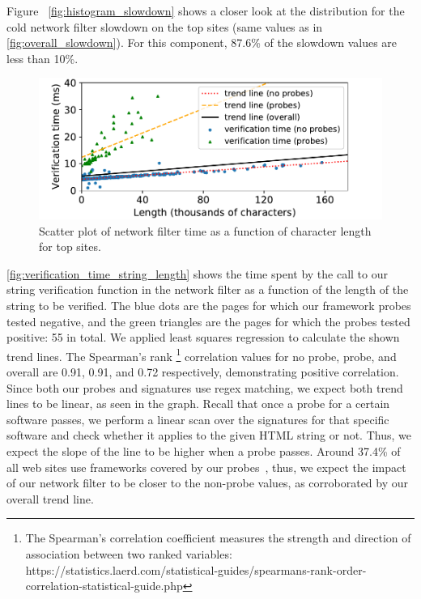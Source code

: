 Figure ~\ref{fig:histogram_slowdown} shows a closer look at the distribution for the cold network filter slowdown on the top sites (same values as in \autoref{fig:overall_slowdown}). For this component, 87.6\% of the slowdown values are less than 10\%.
\fi

\begin{figure}[h]
	\includegraphics[scale=0.5]{results/string_length_vs_verification_time_small.pdf}
	\caption{Scatter plot of network filter time as a function of character length for top sites.}
	\label{fig:verification_time_string_length}
\end{figure}

 \autoref{fig:verification_time_string_length} shows the time spent by the call to our string verification function in the network filter as a function of the length of the string to be verified. The blue dots are the pages for which our framework probes tested negative, and the green triangles are the pages for which the probes tested positive: 55 in total. We applied least squares regression to calculate the shown trend lines. The Spearman's rank \footnote{The Spearman's correlation coefficient measures the strength and direction of association between two ranked variables: https://statistics.laerd.com/statistical-guides/spearmans-rank-order-correlation-statistical-guide.php} correlation values for no probe, probe, and overall are 0.91, 0.91, and 0.72 respectively, demonstrating positive correlation. Since both our probes and signatures use regex matching, we expect both trend lines to be linear, as seen in the graph. Recall that once a probe for a certain software passes, we perform a linear scan over the signatures for that specific software and check whether it applies to the given HTML string or not. Thus, we expect the slope of the line to be higher when a probe passes. Around 37.4\% of all web sites use frameworks covered by our probes~\cite{w3stats}, thus, we expect the impact of our network filter to be closer to the non-probe values, as corroborated by our overall trend line.
 

